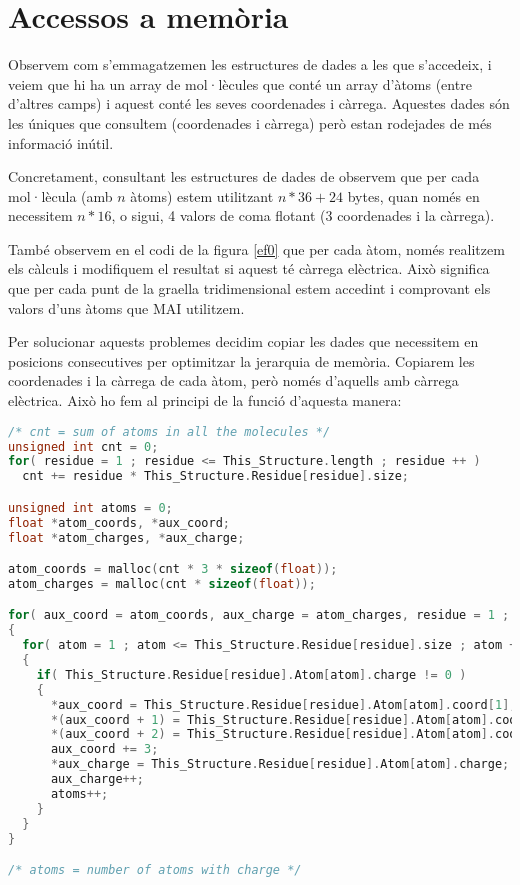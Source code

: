 
\section{Accessos a memòria}

Observem com s'emmagatzemen les estructures de dades a les que s'accedeix, i veiem que hi ha un array de mol·lècules que conté un array d'àtoms (entre d'altres camps) i aquest conté les seves coordenades i càrrega. Aquestes dades són les úniques que consultem (coordenades i càrrega) però estan rodejades de més informació inútil.

Concretament, consultant les estructures de dades de  observem que per cada mol·lècula (amb $n$ àtoms) estem utilitzant $ n * 36 + 24$ bytes, quan només en necessitem $ n * 16 $, o sigui, 4 valors de coma flotant (3 coordenades i la càrrega).

També observem en el codi de la figura \ref{ef0} que per cada àtom, només realitzem els càlculs i modifiquem el resultat si aquest té càrrega elèctrica. Això significa que per cada punt de la graella tridimensional estem accedint i comprovant els valors d'uns àtoms que MAI utilitzem.

Per solucionar aquests problemes decidim copiar les dades que necessitem en posicions consecutives per optimitzar la jerarquia de memòria. Copiarem les coordenades i la càrrega de cada àtom, però només d'aquells amb càrrega elèctrica. Això ho fem al principi de la funció  d'aquesta manera:

\begin{lstlisting}[label=mem, caption=Còpia de dades per optimitzar jerarquia de memòria, language=C]
/* cnt = sum of atoms in all the molecules */
unsigned int cnt = 0;
for( residue = 1 ; residue <= This_Structure.length ; residue ++ )
  cnt += residue * This_Structure.Residue[residue].size;

unsigned int atoms = 0;
float *atom_coords, *aux_coord;
float *atom_charges, *aux_charge;

atom_coords = malloc(cnt * 3 * sizeof(float));
atom_charges = malloc(cnt * sizeof(float));

for( aux_coord = atom_coords, aux_charge = atom_charges, residue = 1 ; residue <= This_Structure.length ; residue ++ )
{
  for( atom = 1 ; atom <= This_Structure.Residue[residue].size ; atom ++ )
  {
    if( This_Structure.Residue[residue].Atom[atom].charge != 0 )
    {
      *aux_coord = This_Structure.Residue[residue].Atom[atom].coord[1];
      *(aux_coord + 1) = This_Structure.Residue[residue].Atom[atom].coord[2];
      *(aux_coord + 2) = This_Structure.Residue[residue].Atom[atom].coord[3];
      aux_coord += 3;
      *aux_charge = This_Structure.Residue[residue].Atom[atom].charge;
      aux_charge++;
      atoms++;
    }
  }
}

/* atoms = number of atoms with charge */
\end{lstlisting}

